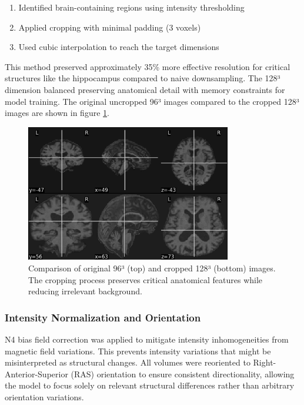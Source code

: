 \documentclass[12pt, a4paper]{article}
\begin{document}
\begin{enumerate}
    \item Identified brain-containing regions using intensity thresholding
    \item Applied cropping with minimal padding (3 voxels)
    \item Used cubic interpolation to reach the target dimensions
\end{enumerate}

This method preserved approximately 35\% more effective resolution for critical structures like the hippocampus compared to naive downsampling. The 128³ dimension balanced preserving anatomical detail with memory constraints for model training. The original uncropped 96³ images compared to the cropped 128³ images are shown in figure \ref{fig:cropping}.
\begin{figure}[htbp]
  \centering
  \includegraphics[width=0.8\textwidth]{figures/cropping.png}
  \caption{Comparison of original 96³ (top) and cropped 128³ (bottom) images. The cropping process preserves critical anatomical features while reducing irrelevant background.}
  \label{fig:cropping}
\end{figure}

\subsubsection{Intensity Normalization and Orientation}

N4 bias field correction was applied to mitigate intensity inhomogeneities from magnetic field variations. This prevents intensity variations that might be misinterpreted as structural changes. All volumes were reoriented to Right-Anterior-Superior (RAS) orientation to ensure consistent directionality, allowing the model to focus solely on relevant structural differences rather than arbitrary orientation variations.
\end{document}
